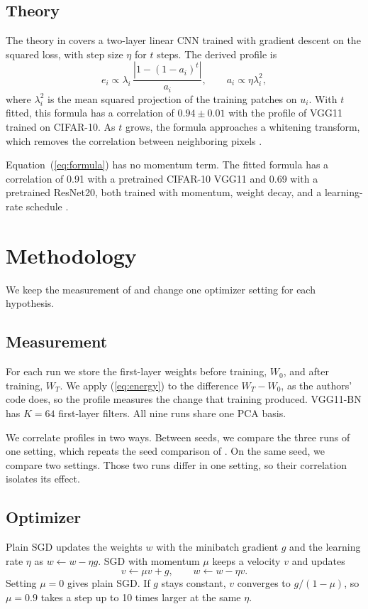 \documentclass[conference]{IEEEtran}
\begin{document}
\subsection{Theory}
The theory in \cite{chowers2023} covers a two-layer linear CNN trained with
gradient descent on the squared loss, with step size $\eta$ for $t$ steps. The
derived profile is
\begin{equation}
e_i \propto \lambda_i\,\frac{\left|1-(1-a_i)^t\right|}{a_i},
\qquad a_i \propto \eta\lambda_i^2,
\label{eq:formula}
\end{equation}
where $\lambda_i^2$ is the mean squared projection of the training patches on
$u_i$. With $t$ fitted, this formula has a correlation of $0.94\pm0.01$ with
the profile of VGG11 trained on CIFAR-10. As $t$ grows, the formula approaches
a whitening transform, which removes the correlation between neighboring
pixels \cite{chowers2023}.

Equation~(\ref{eq:formula}) has no momentum term. The fitted formula has a
correlation of 0.91 with a pretrained CIFAR-10 VGG11 and 0.69 with a
pretrained ResNet20, both trained with momentum, weight decay, and a
learning-rate schedule \cite{chowers2023}.

\section{Methodology}
We keep the measurement of \cite{chowers2023} and change one optimizer setting
for each hypothesis.

\subsection{Measurement}
For each run we store the first-layer weights before training, $W_0$, and
after training, $W_T$. We apply (\ref{eq:energy}) to the difference
$W_T-W_0$, as the authors' code does, so the profile measures the change that
training produced. VGG11-BN has $K=64$ first-layer filters. All nine runs share
one PCA basis.

We correlate profiles in two ways. Between seeds, we compare the three runs of
one setting, which repeats the seed comparison of \cite{chowers2023}. On the
same seed, we compare two settings. Those two runs differ in one setting, so
their correlation isolates its effect.

\subsection{Optimizer}
Plain SGD updates the weights $w$ with the minibatch gradient $g$ and the
learning rate $\eta$ as $w \leftarrow w-\eta g$. SGD with momentum $\mu$
keeps a velocity $v$ and updates
\begin{equation}
v \leftarrow \mu v+g, \qquad w \leftarrow w-\eta v.
\label{eq:momentum}
\end{equation}
Setting $\mu=0$ gives plain SGD. If $g$ stays constant, $v$ converges to
$g/(1-\mu)$, so $\mu=0.9$ takes a step up to 10 times larger at the same
$\eta$.
\end{document}
